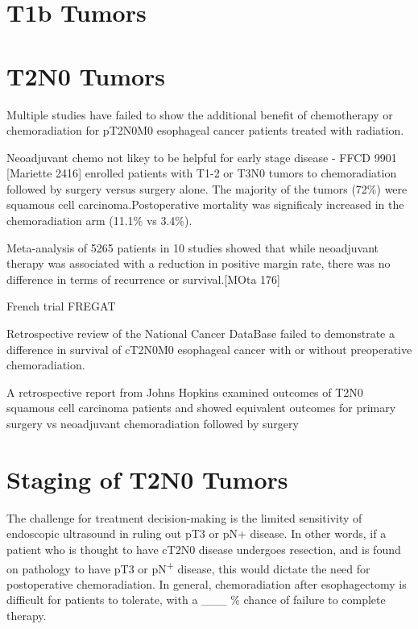 \documentclass[
]{book}
\begin{document}
\hypertarget{t1b-tumors}{%
\section{T1b Tumors}\label{t1b-tumors}}

\hypertarget{t2n0-tumors}{%
\section{T2N0 Tumors}\label{t2n0-tumors}}

Multiple studies have failed to show the additional benefit of chemotherapy or chemoradiation for pT2N0M0 esophageal cancer patients treated with radiation.

Neoadjuvant chemo not likey to be helpful for early stage disease - FFCD 9901 {[}Mariette 2416{]} enrolled patients with T1-2 or T3N0 tumors to chemoradiation followed by surgery versus surgery alone. The majority of the tumors (72\%) were squamous cell carcinoma.Postoperative mortality was significaly increased in the chemoradiation arm (11.1\% vs 3.4\%).

Meta-analysis of 5265 patients in 10 studies showed that while neoadjuvant therapy was associated with a reduction in positive margin rate, there was no difference in terms of recurrence or survival.{[}MOta 176{]}

French trial FREGAT\citep{markar59}

Retrospective review of the National Cancer DataBase failed to demonstrate a difference in survival of cT2N0M0 esophageal cancer with or without preoperative chemoradiation.\citep{speicher1195}

A retrospective report from Johns Hopkins examined outcomes of T2N0 squamous cell carcinoma patients and showed equivalent outcomes for primary surgery vs neoadjuvant chemoradiation followed by surgery \citep{zhang429}

\hypertarget{staging-of-t2n0-tumors}{%
\section{Staging of T2N0 Tumors}\label{staging-of-t2n0-tumors}}

The challenge for treatment decision-making is the limited sensitivity of endoscopic ultrasound in ruling out pT3 or pN+ disease. In other words, if a patient who is thought to have cT2N0 disease undergoes resection, and is found on pathology to have pT3 or pN\textsuperscript{+} disease, this would dictate the need for postoperative chemoradiation. In general, chemoradiation after esophagectomy is difficult for patients to tolerate, with a \_\_\_ \% chance of failure to complete therapy.
\end{document}
